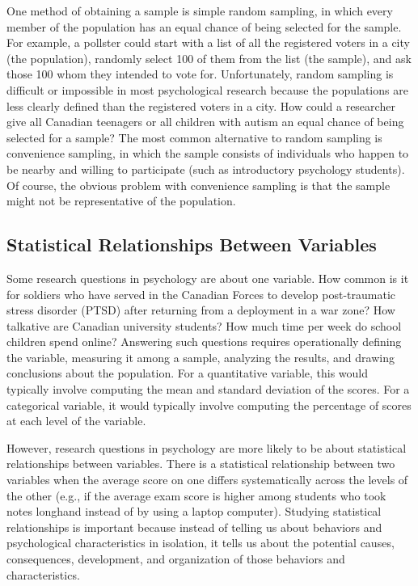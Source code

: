 One method of obtaining a sample is simple random sampling, in which every member of the population has an equal chance of being selected for the sample. For example, a pollster could start with a list of all the registered voters in a city (the population), randomly select 100 of them from the list (the sample), and ask those 100 whom they intended to vote for. Unfortunately, random sampling is difficult or impossible in most psychological research because the populations are less clearly defined than the registered voters in a city. How could a researcher give all Canadian teenagers or all children with autism an equal chance of being selected for a sample? The most common alternative to random sampling is convenience sampling, in which the sample consists of individuals who happen to be nearby and willing to participate (such as introductory psychology students). Of course, the obvious problem with convenience sampling is that the sample might not be representative of the population.

\subsection{Statistical Relationships Between Variables}
Some research questions in psychology are about one variable. How common is it for soldiers who have served in the Canadian Forces to develop post-traumatic stress disorder (PTSD) after returning from a deployment in a war zone? How talkative are Canadian university students? How much time per week do school children spend online? Answering such questions requires operationally defining the variable, measuring it among a sample, analyzing the results, and drawing conclusions about the population. For a quantitative variable, this would typically involve computing the mean and standard deviation of the scores. For a categorical variable, it would typically involve computing the percentage of scores at each level of the variable.

However, research questions in psychology are more likely to be about statistical relationships between variables. There is a statistical relationship between two variables when the average score on one differs systematically across the levels of the other (e.g., if the average exam score is higher among students who took notes longhand instead of by using a laptop computer). Studying statistical relationships is important because instead of telling us about behaviors and psychological characteristics in isolation, it tells us about the potential causes, consequences, development, and organization of those behaviors and characteristics.

